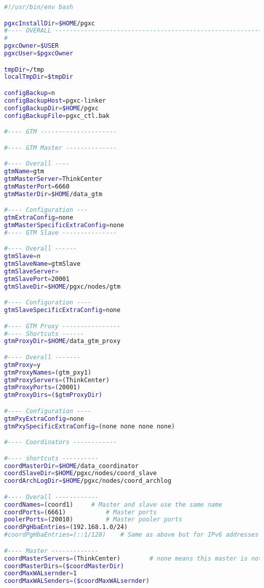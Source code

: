 \label{appendix:pgxcctlconfig} 
\begin{lstlisting}[language=bash,caption={Konfigurationsdatei pgxc-ctl}]
#!/usr/bin/env bash

pgxcInstallDir=$HOME/pgxc
#---- OVERALL -----------------------------------------------------------------------------
#
pgxcOwner=$USER	
pgxcUser=$pgxcOwner

tmpDir=/tmp		
localTmpDir=$tmpDir	

configBackup=n					
configBackupHost=pgxc-linker	
configBackupDir=$HOME/pgxc		
configBackupFile=pgxc_ctl.bak	

#---- GTM ---------------------

#---- GTM Master --------------

#---- Overall ----
gtmName=gtm
gtmMasterServer=ThinkCenter
gtmMasterPort=6660
gtmMasterDir=$HOME/data_gtm

#---- Configuration ---
gtmExtraConfig=none		
gtmMasterSpecificExtraConfig=none	
#---- GTM Slave ---------------

#---- Overall ------
gtmSlave=n					
gtmSlaveName=gtmSlave
gtmSlaveServer=		
gtmSlavePort=20001			
gtmSlaveDir=$HOME/pgxc/nodes/gtm	

#---- Configuration ----
gtmSlaveSpecificExtraConfig=none

#---- GTM Proxy ----------------
#---- Shortcuts ------
gtmProxyDir=$HOME/data_gtm_proxy

#---- Overall -------
gtmProxy=y				
gtmProxyNames=(gtm_pxy1)
gtmProxyServers=(ThinkCenter)		
gtmProxyPorts=(20001)				
gtmProxyDirs=($gtmProxyDir)

#---- Configuration ----
gtmPxyExtraConfig=none		
gtmPxySpecificExtraConfig=(none none none none)

#---- Coordinators ------------

#---- shortcuts ----------
coordMasterDir=$HOME/data_coordinator
coordSlaveDir=$HOME/pgxc/nodes/coord_slave
coordArchLogDir=$HOME/pgxc/nodes/coord_archlog

#---- Overall ------------
coordNames=(coord1)		# Master and slave use the same name
coordPorts=(6661)			# Master ports
poolerPorts=(20010)			# Master pooler ports
coordPgHbaEntries=(192.168.1.0/24)				
#coordPgHbaEntries=(::1/128)	# Same as above but for IPv6 addresses

#---- Master -------------
coordMasterServers=(ThinkCenter)		# none means this master is not available
coordMasterDirs=($coordMasterDir)
coordMaxWALsernder=1	
coordMaxWALSenders=($coordMaxWALsernder)


\end{lstlisting}
